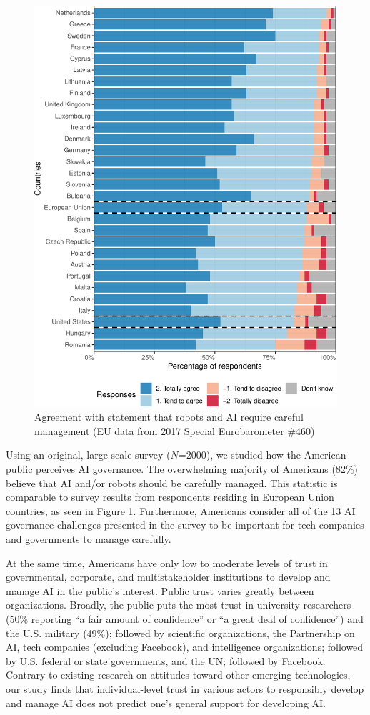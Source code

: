 \documentclass{article}
\begin{document}
\begin{figure}
\centering
\includegraphics{images/eu-1.pdf}
\caption{Agreement with statement that robots and AI require careful management (EU data from 2017 Special Eurobarometer \#460)}
\label{fig:manage}
\end{figure}

Using an original, large-scale survey ($N$=2000), we studied how the American public perceives AI governance. The overwhelming majority of Americans (82\%) believe that AI and/or robots should be carefully managed. This statistic is comparable to survey results from respondents residing in European Union countries, as seen in Figure \ref{fig:manage}. Furthermore, Americans consider all of the 13 AI governance challenges presented in the survey to be important for tech companies and governments to manage carefully. 

At the same time, Americans have only low to moderate levels of trust in governmental, corporate, and multistakeholder institutions to develop and manage AI in the public's interest. Public trust varies greatly between organizations. Broadly, the public puts the most trust in university researchers (50\% reporting ``a fair amount of confidence'' or ``a great deal of confidence'') and the U.S. military (49\%); followed by scientific organizations, the Partnership on AI, tech companies (excluding Facebook), and intelligence organizations; followed by U.S. federal or state governments, and the UN; followed by Facebook. Contrary to existing research on attitudes toward other emerging technologies, our study finds that individual-level trust in various actors to responsibly develop and manage AI does not predict one's general support for developing AI. 
\end{document}
